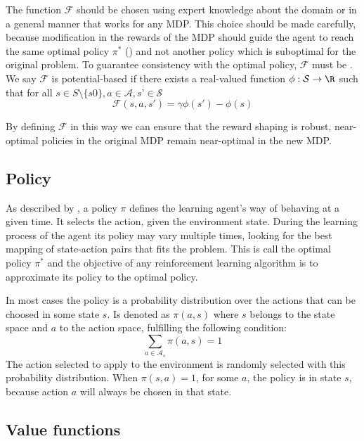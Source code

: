 The function $\mathcal{F}$ should be chosen using expert knowledge about the domain or in a general manner that works for any MDP. This choice should be made carefully, because modification in the rewards of the MDP should guide the agent to reach the same optimal policy $\pi^*$ () and not another policy which is suboptimal for the original problem. To guarantee consistency with the optimal policy, $\mathcal{F}$ must be . We say $\mathcal{F}$ is potential-based if there exists a real-valued function
$\phi : \mathcal{S} \rightarrow \R$ such that for all $s \in S \setminus \{s0\} , a ∈ \mathcal{A}, s’ \in \mathcal{S}$
\begin{equation}
    \mathcal{F}(s, a, s') = \gamma \phi(s') - \phi(s)
\end{equation}

By defining $\mathcal{F}$ in this way we can ensure that the reward shaping is robust, near-optimal policies in the original \ac{MDP} remain near-optimal in the new \ac{MDP}.

\subsection{Policy\label{subsec:policy}}

As described by \citeauthor*[Section~1.3]{sutton1998introduction}, a policy $\pi$ defines the learning agent’s way of behaving at a given time. It selects the action, given the environment state. During the learning process of the agent its policy may vary multiple times, looking for the best mapping of state-action pairs that fits the problem. This is call the optimal policy $\pi^*$ and the objective of any reinforcement learning algorithm is to approximate its policy to the optimal policy.

In most cases the policy is a probability distribution over the actions that can be choosed in some state $s$. Is denoted as $\pi(a,s)$ where $s$ belongs to the state space and $a$ to the action space, fulfilling the following condition:
\begin{equation}
    \sum_{a \in \mathcal{A}_s} \pi(a,s) = 1
\end{equation}
The action selected to apply to the environment is randomly selected with this probability distribution. When $\pi(s,a)=1$, for some $a$, the policy is  in state $s$, because action $a$ will always be chosen in that state.

\subsection{Value functions}

